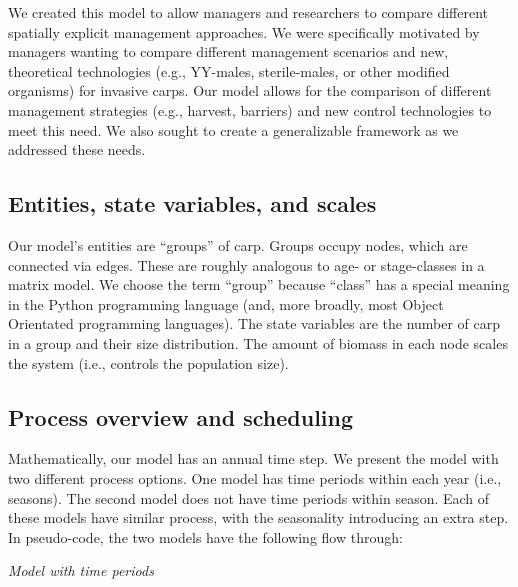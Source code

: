 \documentclass{article}[12pt]
\begin{document}
We created this model to allow managers and researchers to compare different spatially explicit management approaches.
We were specifically motivated by managers wanting to compare different management scenarios and new, theoretical technologies (e.g., YY-males, sterile-males, or other modified organisms) for invasive carps. 
Our model allows for the comparison of different management strategies (e.g., harvest, barriers) and new control technologies to meet this need.
We also sought to create a generalizable framework as we addressed these needs. 

\subsection{Entities, state variables, and scales}

Our model's entities are ``groups'' of carp. 
Groups occupy nodes, which are connected via edges.
These are roughly analogous to age- or stage-classes in a matrix model.
We choose the term ``group'' because ``class'' has a special meaning in the Python programming language (and, more broadly, most Object Orientated programming languages). 
The state variables are the number of carp in a group and their size distribution.
The amount of biomass in each node scales the system (i.e., controls the population size). 

\subsection{Process overview and scheduling}

Mathematically, our model has an annual time step.
We present the model with two different process options.
One model has time periods within each year (i.e., seasons).
The second model does not have time periods within season. 
Each of these models have similar process, with the seasonality introducing an extra step. 
In pseudo-code, the two models have the following flow through: 

\noindent \textit{Model with time periods}
\end{document}
